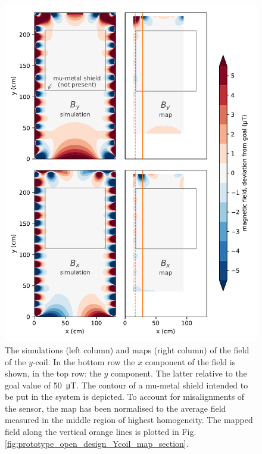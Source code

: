 
\begin{figure}
  \centering
  \includegraphics[width=\linewidth]{gfx/prototype/open_planar_map_comparison.pdf}
  \caption{The simulations (left column) and maps (right column) of the field of the $y$-coil. In the bottom row the $x$ component of the field is shown, in the top row: the $y$ component. The latter relative to the goal value of \SI{50}{\micro\tesla}. The contour of a mu-metal shield intended to be put in the system is depicted. To account for misalignments of the sensor, the map has been normalised to the average field measured in the middle region of highest homogeneity. The mapped field along the vertical orange lines is plotted in Fig.\,\ref{fig:prototype_open_design_Ycoil_map_section}.}\label{fig:prototype_open_design_Ycoil_maps}
\end{figure}


